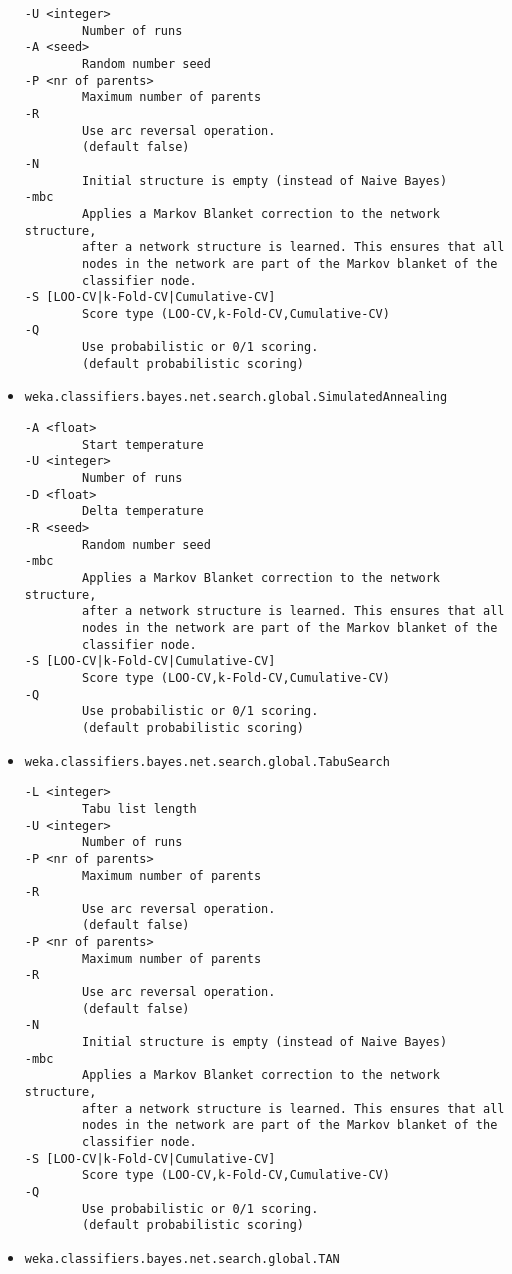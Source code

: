 \begin{itemize}
\begin{verbatim}
-U <integer>
        Number of runs
-A <seed>
        Random number seed
-P <nr of parents>
        Maximum number of parents
-R
        Use arc reversal operation.
        (default false)
-N
        Initial structure is empty (instead of Naive Bayes)
-mbc
        Applies a Markov Blanket correction to the network structure,
        after a network structure is learned. This ensures that all
        nodes in the network are part of the Markov blanket of the
        classifier node.
-S [LOO-CV|k-Fold-CV|Cumulative-CV]
        Score type (LOO-CV,k-Fold-CV,Cumulative-CV)
-Q
        Use probabilistic or 0/1 scoring.
        (default probabilistic scoring)
  \end{verbatim}
\item \texttt{weka.classifiers.bayes.net.search.global.SimulatedAnnealing}
  \begin{verbatim}
-A <float>
        Start temperature
-U <integer>
        Number of runs
-D <float>
        Delta temperature
-R <seed>
        Random number seed
-mbc
        Applies a Markov Blanket correction to the network structure,
        after a network structure is learned. This ensures that all
        nodes in the network are part of the Markov blanket of the
        classifier node.
-S [LOO-CV|k-Fold-CV|Cumulative-CV]
        Score type (LOO-CV,k-Fold-CV,Cumulative-CV)
-Q
        Use probabilistic or 0/1 scoring.
        (default probabilistic scoring)
  \end{verbatim}
\item \texttt{weka.classifiers.bayes.net.search.global.TabuSearch}
  \begin{verbatim}
-L <integer>
        Tabu list length
-U <integer>
        Number of runs
-P <nr of parents>
        Maximum number of parents
-R
        Use arc reversal operation.
        (default false)
-P <nr of parents>
        Maximum number of parents
-R
        Use arc reversal operation.
        (default false)
-N
        Initial structure is empty (instead of Naive Bayes)
-mbc
        Applies a Markov Blanket correction to the network structure,
        after a network structure is learned. This ensures that all
        nodes in the network are part of the Markov blanket of the
        classifier node.
-S [LOO-CV|k-Fold-CV|Cumulative-CV]
        Score type (LOO-CV,k-Fold-CV,Cumulative-CV)
-Q
        Use probabilistic or 0/1 scoring.
        (default probabilistic scoring)
  \end{verbatim}
\item \texttt{weka.classifiers.bayes.net.search.global.TAN}

\end{itemize}

